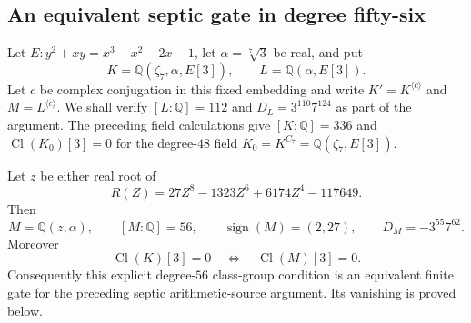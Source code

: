 \subsection{An equivalent septic gate in degree fifty-six}

Let $E:y^2+xy=x^3-x^2-2x-1$, let
$\alpha=\sqrt[7]{3}$ be real, and put
\[
 K=\mathbb Q(\zeta_7,\alpha,E[3]),\qquad
 L=\mathbb Q(\alpha,E[3]).
\]
Let $c$ be complex conjugation in this fixed embedding and
write $K'=K^{\langle c\rangle}$ and
$M=L^{\langle c\rangle}$.
We shall verify $[L:\mathbb Q]=112$ and
$D_L=3^{110}7^{124}$ as part of the argument.
The preceding field calculations give $[K:\mathbb Q]=336$ and
$\operatorname{Cl}(K_0)[3]=0$ for the degree-$48$
field $K_0=K^{C_7}=\mathbb Q(\zeta_7,E[3])$.

\begin{proposition}\label{prop:lm-septic-degree56}
Let $z$ be either real root of
\[
 R(Z)=27Z^8-1323Z^6+6174Z^4-117649.
\]
Then
\[
 M=\mathbb Q(z,\alpha),\qquad [M:\mathbb Q]=56,
 \qquad \operatorname{sign}(M)=(2,27),
 \qquad D_M=-3^{55}7^{62}.
\]
Moreover
\[
 \operatorname{Cl}(K)[3]=0
 \quad\Longleftrightarrow\quad
 \operatorname{Cl}(M)[3]=0.
\]
Consequently this explicit degree-$56$ class-group condition
is an equivalent finite gate for the preceding septic
arithmetic-source argument.  Its vanishing is proved below.
\end{proposition}
